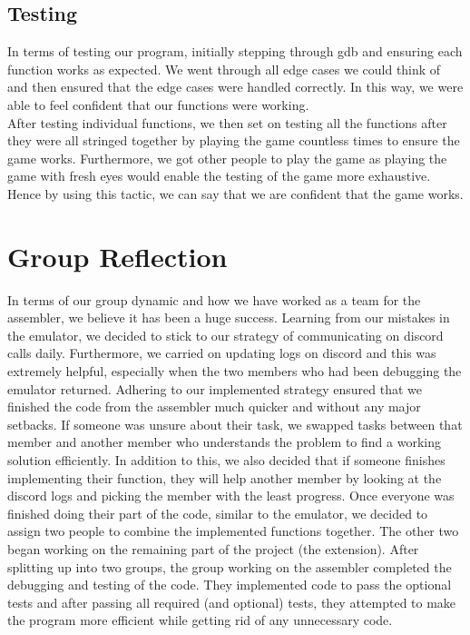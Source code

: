 \documentclass[11pt]{article}
\begin{document}
\subsection{Testing}
In terms of testing our program, initially stepping through gdb and ensuring each function works as expected. We went through all edge cases we could think of and then ensured that the edge cases were handled correctly. In this way, we were able to feel confident that our functions were working.
\\After testing individual functions, we then set on testing all the functions after they were all stringed together by playing the game countless times to ensure the game works. Furthermore, we got other people to play the game as playing the game with fresh eyes would enable the testing of the game more exhaustive. Hence by using this tactic, we can say that we are confident that the game works.

\section{Group Reflection}
In terms of our group dynamic and how we have worked as a team for the assembler, we believe it has been a huge success. Learning from our mistakes in the emulator, we decided to stick to our strategy of communicating on discord calls daily. Furthermore, we carried on updating logs on discord and this was extremely helpful, especially when the two members who had been debugging the emulator returned. Adhering to our implemented strategy ensured that we finished the code from the assembler much quicker and without any major setbacks. If someone was unsure about their task, we swapped tasks between that member and another member who understands the problem to find a working solution efficiently. In addition to this, we also decided that if someone finishes implementing their function, they will help another member by looking at the discord logs and picking the member with the least progress. Once everyone was finished doing their part of the code, similar to the emulator, we decided to assign two people to combine the implemented functions together. The other two began working on the remaining part of the project (the extension). After splitting up into two groups, the group working on the assembler completed the debugging and testing of the code. They implemented code to pass the optional tests and after passing all required (and optional) tests, they attempted to make the program more efficient while getting rid of any unnecessary code.
\end{document}
